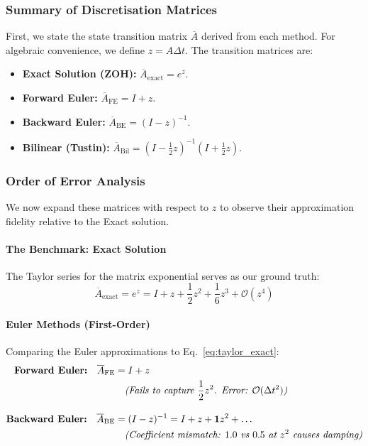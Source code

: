 \documentclass[a4paper,11pt]{article}
\begin{document}
\subsubsection{Summary of Discretisation Matrices}
First, we state the state transition matrix $\overline{A}$ derived from each method. For algebraic convenience, we define $z = A \Delta t$. The transition matrices are:
\begin{itemize}
    \item \textbf{Exact Solution (ZOH):} $\overline{A}_{\text{exact}} = e^z$.
    \item \textbf{Forward Euler:} $\overline{A}_{\text{FE}} = I + z$.
    \item \textbf{Backward Euler:} $\overline{A}_{\text{BE}} = (I - z)^{-1}$.
    \item \textbf{Bilinear (Tustin):} $\overline{A}_{\text{Bil}} = \left( I - \frac{1}{2}z \right)^{-1} \left( I + \frac{1}{2}z \right)$.
\end{itemize}

\subsubsection{Order of Error Analysis}
We now expand these matrices with respect to $z$ to observe their approximation fidelity relative to the Exact solution.

\paragraph{The Benchmark: Exact Solution}
The Taylor series for the matrix exponential serves as our ground truth:
\begin{equation} \label{eq:taylor_exact}
    \overline{A}_{\text{exact}} = e^z = I + z + \frac{1}{2}z^2 + \frac{1}{6}z^3 + \mathcal{O}(z^4)
\end{equation}

\paragraph{Euler Methods (First-Order)}
Comparing the Euler approximations to Eq.~\eqref{eq:taylor_exact}:
\begin{align}
    \textbf{Forward Euler:} \quad \overline{A}_{\text{FE}} &= I + z \label{eq:taylor_fe} \\
    &\quad \textit{(Fails to capture $\frac{1}{2}z^2$. Error: $\mathcal{O}(\Delta t^2)$)} \notag  \\[1em]
    \textbf{Backward Euler:} \quad \overline{A}_{\text{BE}} &= (I - z)^{-1} = I + z + \mathbf{1}z^2 + \dots \label{eq:taylor_be} \\
    &\quad \textit{(Coefficient mismatch: $1.0$ vs $0.5$ at $z^2$ causes damping)} \notag 
\end{align}
\end{document}
